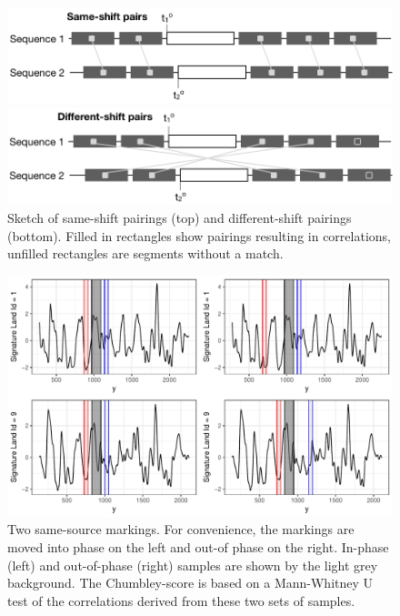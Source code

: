 \documentclass[12pt]{article}
\begin{document}
\begin{figure}[hbtp]
\centering
\includegraphics[width=.7\textwidth]{images/sketch-same.png}

\includegraphics[width=.7\textwidth]{images/sketch-diff.png}
\caption{\label{sketch-same-diff}Sketch of same-shift pairings  (top) and different-shift pairings (bottom). Filled in rectangles show pairings resulting in correlations, unfilled rectangles are segments without a match.}
\end{figure}

\begin{figure}

{\centering \includegraphics[width=\textwidth]{figures/win-comparison-1} 

}

\caption{Two same-source markings. For convenience, the markings are moved into phase on the left and out-of phase on the right. In-phase (left) and out-of-phase (right) samples are shown by the light grey background. The Chumbley-score is based on a Mann-Whitney U test of the correlations derived from these two sets of samples.}\label{fig:win-comparison}
\end{figure}
\end{document}
